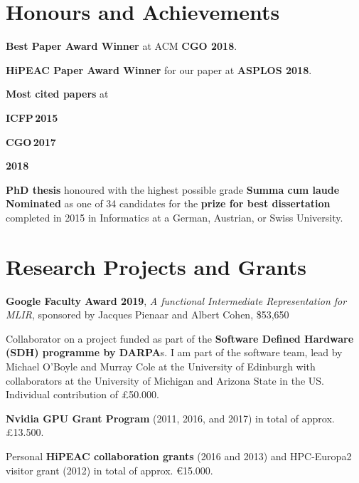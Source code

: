 \documentclass[11pt,a4paper]{moderncv}
\newcommand{\strong}[1]{\textcolor{color1}{\textbf{#1}}}
\newcommand{\highlight}[1]{\textcolor{color1}{#1}}
\begin{document}
\section{Honours and Achievements}
\begin{cvitemize}
    \item \strong{Best Paper Award Winner} at ACM \strong{CGO 2018}.
    \item \strong{HiPEAC Paper Award Winner} for our paper at \strong{ASPLOS 2018}.
    \item \strong{Most cited papers} at
        \begin{inlineItemize}
        \item \strong{ICFP\,2015}
        \item \strong{CGO\,2017}
        \item \strong{2018}
        \end{inlineItemize}
    \item \strong{PhD thesis} honoured with the highest possible grade \strong{Summa cum laude}\newline
          \strong{Nominated} as one of 34 candidates for the \strong{prize for best dissertation} completed in 2015 in Informatics at a German, Austrian, or Swiss University.
\end{cvitemize}

\section{Research Projects and Grants}
\begin{cvitemize}
    \item \strong{Google Faculty Award 2019}, \textit{A functional Intermediate Representation for MLIR}, sponsored by Jacques Pienaar and Albert Cohen, \highlight{\$53,650}
    \item Collaborator on a project funded as part of the \strong{Software Defined Hardware (SDH) programme by DARPA}s. I am part of the software team, lead by Michael O'Boyle and Murray Cole at the University of Edinburgh with collaborators at the University of Michigan and Arizona State in the US.
      Individual contribution of \highlight{£50.000}.
    \item \strong{Nvidia GPU Grant Program} (2011, 2016, and 2017) in total of approx. \highlight{£13.500}.
    \item Personal \strong{HiPEAC collaboration grants} (2016 and 2013) and HPC-Europa2 visitor grant (2012) in total of approx. \highlight{€15.000}.
\end{cvitemize}
\end{document}
